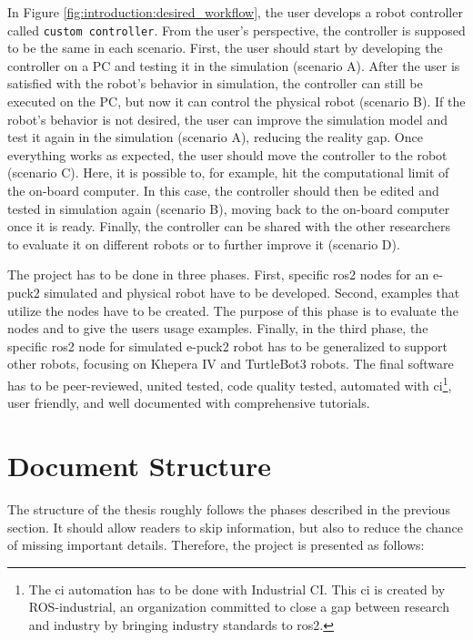 In Figure \ref{fig:introduction:desired_workflow}, the user develops a robot controller called \texttt{custom controller}.
From the user's perspective, the controller is supposed to be the same in each scenario.
First, the user should start by developing the controller on a PC and testing it in the simulation (scenario A).
After the user is satisfied with the robot's behavior in simulation, the controller can still be executed on the PC, but now it can control the physical robot (scenario B).
If the robot's behavior is not desired, the user can improve the simulation model and test it again in the simulation (scenario A), reducing the reality gap.
Once everything works as expected, the user should move the controller to the robot (scenario C).
Here, it is possible to, for example, hit the computational limit of the on-board computer. In this case, the controller should then be edited and tested in simulation again (scenario B), moving back to the on-board computer once it is ready.
Finally, the controller can be shared with the other researchers to evaluate it on different robots or to further improve it (scenario D).

The project has to be done in three phases.
First, specific \ac{ros2} nodes for an e-puck2 simulated and physical robot have to be developed.
Second, examples that utilize the nodes have to be created. 
The purpose of this phase is to evaluate the nodes and to give the users usage examples.
Finally, in the third phase, the specific \ac{ros2} node for simulated e-puck2 robot has to be generalized to support other robots, focusing on Khepera IV and TurtleBot3 robots.
The final software has to be peer-reviewed, united tested, code quality tested, automated with \ac{ci}\footnote{The \ac{ci} automation has to be done with Industrial CI. This \ac{ci} is created by ROS-industrial, an organization committed to close a gap between research and industry by bringing industry standards to \ac{ros2}.}, user friendly, and well documented with comprehensive tutorials.

\section{Document Structure}

The structure of the thesis roughly follows the phases described in the previous section.
It should allow readers to skip information, but also to reduce the chance of missing important details.
Therefore, the project is presented as follows:

